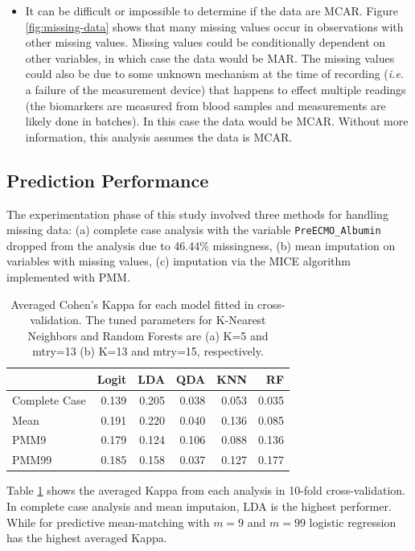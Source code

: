 \documentclass[12pt,]{article}
\providecommand{\tightlist}{%
  \setlength{\itemsep}{0pt}\setlength{\parskip}{0pt}}
\begin{document}
\begin{itemize}
\tightlist
\item
  It can be difficult or impossible to determine if the data are MCAR.
  Figure \ref{fig:missing-data} shows that many missing values occur in
  observations with other missing values. Missing values could be
  conditionally dependent on other variables, in which case the data
  would be MAR. The missing values could also be due to some unknown
  mechanism at the time of recording (\emph{i.e.} a failure of the
  measurement device) that happens to effect multiple readings (the
  biomarkers are measured from blood samples and measurements are likely
  done in batches). In this case the data would be MCAR. Without more
  information, this analysis assumes the data is MCAR.
\end{itemize}

\subsection{Prediction Performance}\label{prediction-performance}

The experimentation phase of this study involved three methods for
handling missing data: (a) complete case analysis with the variable
\texttt{PreECMO\_Albumin} dropped from the analysis due to 46.44\%
missingness, (b) mean imputation on variables with missing values, (c)
imputation via the MICE algorithm implemented with PMM.

\begin{table}[!h]

\caption{\label{tab:unnamed-chunk-5}\label{tab:cv-kappa} Averaged Cohen's Kappa for each model fitted in cross-validation.  The tuned parameters for K-Nearest Neighbors and Random Forests are (a) K=5 and mtry=13 (b) K=13 and mtry=15, respectively.}
\centering
\fontsize{10}{12}\selectfont
\begin{tabular}{lrrrrr}
\toprule
  & Logit & LDA & QDA & KNN & RF\\
\midrule
Complete Case & 0.139 & 0.205 & 0.038 & 0.053 & 0.035\\
Mean & 0.191 & 0.220 & 0.040 & 0.136 & 0.085\\
PMM9 & 0.179 & 0.124 & 0.106 & 0.088 & 0.136\\
PMM99 & 0.185 & 0.158 & 0.037 & 0.127 & 0.177\\
\bottomrule
\end{tabular}
\end{table}

Table \ref{tab:cv-kappa} shows the averaged Kappa from each analysis in
10-fold cross-validation. In complete case analysis and mean imputaion,
LDA is the highest performer. While for predictive mean-matching with
\(m=9\) and \(m=99\) logistic regression has the highest averaged Kappa.
\end{document}
